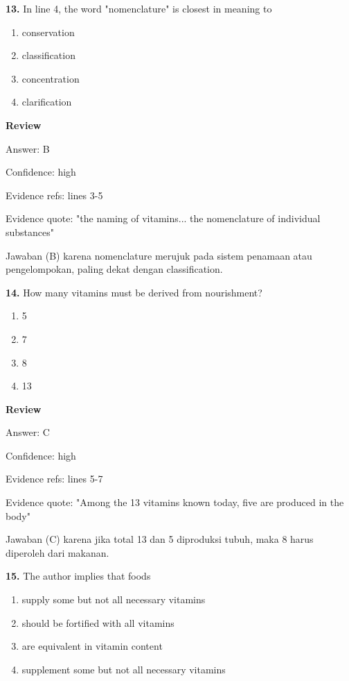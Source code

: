 \documentclass[12pt]{article}
\begin{document}
\vspace{0.25\baselineskip}
\noindent\textbf{13.} In line 4, the word "nomenclature" is closest in meaning to
\begin{enumerate}[label=(\Alph*),leftmargin=*,itemsep=0.2em]
\item conservation
\item classification
\item concentration
\item clarification
\end{enumerate}
\par
\begingroup
\setlength{\parskip}{0pt}
\setlength{\parindent}{0pt}
\textbf{Review}\par
Answer: B\par
Confidence: high\par
Evidence refs: lines 3-5\par
Evidence quote: "the naming of vitamins... the nomenclature of individual substances"\par
Jawaban (B) karena nomenclature merujuk pada sistem penamaan atau pengelompokan, paling dekat dengan classification.\par
\endgroup
\par
\vspace{0.25\baselineskip}
\noindent\textbf{14.} How many vitamins must be derived from nourishment?
\begin{enumerate}[label=(\Alph*),leftmargin=*,itemsep=0.2em]
\item 5
\item 7
\item 8
\item 13
\end{enumerate}
\par
\begingroup
\setlength{\parskip}{0pt}
\setlength{\parindent}{0pt}
\textbf{Review}\par
Answer: C\par
Confidence: high\par
Evidence refs: lines 5-7\par
Evidence quote: "Among the 13 vitamins known today, five are produced in the body"\par
Jawaban (C) karena jika total 13 dan 5 diproduksi tubuh, maka 8 harus diperoleh dari makanan.\par
\endgroup
\par
\vspace{0.25\baselineskip}
\noindent\textbf{15.} The author implies that foods
\begin{enumerate}[label=(\Alph*),leftmargin=*,itemsep=0.2em]
\item supply some but not all necessary vitamins
\item should be fortified with all vitamins
\item are equivalent in vitamin content
\item supplement some but not all necessary vitamins
\end{enumerate}
\end{document}
